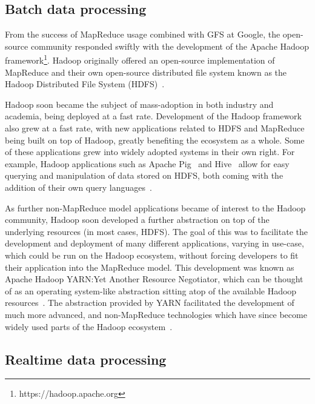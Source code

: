 
\subsection{Batch data processing} %
\label{sub:apache hadoop}

From the success of MapReduce usage combined with GFS at Google, the open-source community responded swiftly with the
development of the Apache Hadoop framework\footnote{https://hadoop.apache.org}. Hadoop originally offered an open-source
implementation of MapReduce and their own open-source distributed file system known as the Hadoop Distributed File System
(HDFS)~\cite{shvachko_hadoop_2010}.

Hadoop soon became the subject of mass-adoption in both industry and academia, being deployed at a fast rate.
Development of the Hadoop framework also grew at a fast rate, with new applications related to HDFS and MapReduce being
built on top of Hadoop, greatly benefiting the ecosystem as a whole. Some of these applications grew into widely adopted
systems in their own right. For example, Hadoop applications such as Apache Pig~\cite{gates_building_2009} and
Hive~\cite{thusoo_hive_2010} allow for easy querying and manipulation of data stored on HDFS, both coming with the
addition of their own query languages~\cite{olston_pig_2008}.

As further non-MapReduce model applications became of interest to the Hadoop community, Hadoop soon
developed a further abstraction on top of the underlying resources (in most cases, HDFS). The goal of this was to
facilitate the development and deployment of many different applications, varying in use-case, which could be run on the
Hadoop ecosystem, without forcing developers to fit their application into the MapReduce model. This development was
known as Apache Hadoop YARN:\@ Yet Another Resource Negotiator, which can be thought of as an operating system-like abstraction sitting
atop of the available Hadoop resources~\cite{vavilapalli_apache_2013}. The abstraction provided by YARN facilitated the
development of much more advanced, and non-MapReduce technologies which have since become widely used parts of the
Hadoop ecosystem~\cite{harrison_hadoops_2012}.


\subsection{Realtime data processing} %
\label{sub:prop_realtime_data_processing}

